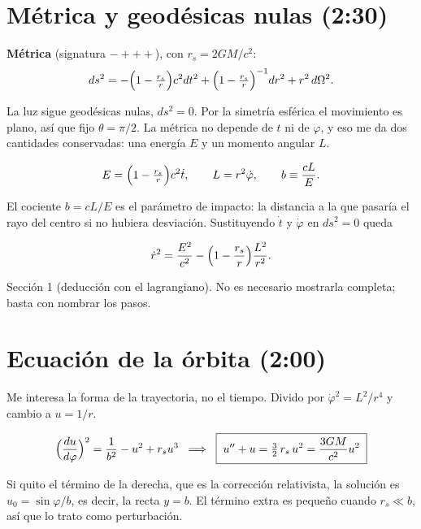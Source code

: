 \documentclass[11pt,a4paper]{article}
\newcommand{\rs}{r_s}
\begin{document}
\section{M\'etrica y geod\'esicas nulas \hfill\small(2:30)}

\noindent\textbf{M\'etrica} (signatura $-+++$), con $\rs=2GM/c^2$:
\[
ds^2=-\Bigl(1-\tfrac{\rs}{r}\Bigr)c^2dt^2+\Bigl(1-\tfrac{\rs}{r}\Bigr)^{-1}dr^2+r^2\,d\Omega^2 .
\]

\begin{decir}
La luz sigue geod\'esicas nulas, $ds^2=0$. Por la simetr\'ia esf\'erica el movimiento es plano, as\'i que fijo $\theta=\pi/2$. La m\'etrica no depende de $t$ ni de $\varphi$, y eso me da dos cantidades conservadas: una energ\'ia $E$ y un momento angular $L$.
\end{decir}

\[
E=\Bigl(1-\tfrac{\rs}{r}\Bigr)c^2\dot t,\qquad L=r^2\dot\varphi,\qquad b\equiv\frac{cL}{E}.
\]

\begin{decir}
El cociente $b=cL/E$ es el par\'ametro de impacto: la distancia a la que pasar\'ia el rayo del centro si no hubiera desviaci\'on. Sustituyendo $\dot t$ y $\dot\varphi$ en $ds^2=0$ queda
\end{decir}
\[
\dot r^2=\frac{E^2}{c^2}-\Bigl(1-\frac{\rs}{r}\Bigr)\frac{L^2}{r^2}.
\]

\begin{notebook}
Secci\'on 1 (deducci\'on con el lagrangiano). No es necesario mostrarla completa; basta con nombrar los pasos.
\end{notebook}

\section{Ecuaci\'on de la \'orbita \hfill\small(2:00)}

\begin{decir}
Me interesa la forma de la trayectoria, no el tiempo. Divido por $\dot\varphi^2=L^2/r^4$ y cambio a $u=1/r$.
\end{decir}
\[
\Bigl(\frac{du}{d\varphi}\Bigr)^2=\frac{1}{b^2}-u^2+\rs u^3
\;\;\Longrightarrow\;\;
\boxed{\;u''+u=\tfrac32\,\rs\,u^2=\frac{3GM}{c^2}u^2\;}
\]

\begin{decir}
Si quito el t\'ermino de la derecha, que es la correcci\'on relativista, la soluci\'on es $u_0=\sin\varphi/b$, es decir, la recta $y=b$. El t\'ermino extra es peque\~no cuando $\rs\ll b$, as\'i que lo trato como perturbaci\'on.
\end{decir}
\end{document}
